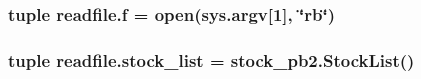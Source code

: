 \subsubsection[{f}]{\setlength{\rightskip}{0pt plus 5cm}tuple readfile.\+f = open(sys.\+argv\mbox{[}1\mbox{]}, \char`\"{}rb\char`\"{})}\label{namespacereadfile_a3b51fb51604ecfdfca5be4a39602f26a}
\hypertarget{namespacereadfile_a4bbf0ca43f05091343701daef0217b8e}{}
\subsubsection[{stock\+\_\+list}]{\setlength{\rightskip}{0pt plus 5cm}tuple readfile.\+stock\+\_\+list = stock\+\_\+pb2.\+Stock\+List()}\label{namespacereadfile_a4bbf0ca43f05091343701daef0217b8e}
